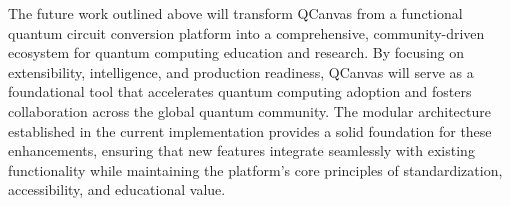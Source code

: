 The future work outlined above will transform QCanvas from a functional quantum circuit conversion platform into a comprehensive, community-driven ecosystem for quantum computing education and research. By focusing on extensibility, intelligence, and production readiness, QCanvas will serve as a foundational tool that accelerates quantum computing adoption and fosters collaboration across the global quantum community. The modular architecture established in the current implementation provides a solid foundation for these enhancements, ensuring that new features integrate seamlessly with existing functionality while maintaining the platform's core principles of standardization, accessibility, and educational value.
